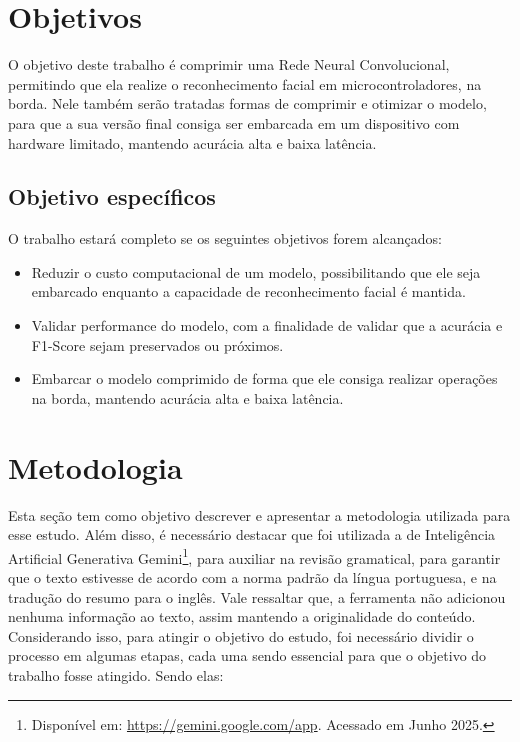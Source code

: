 \section{Objetivos}

O objetivo deste trabalho é comprimir uma Rede Neural Convolucional, permitindo que ela realize o reconhecimento
facial em microcontroladores, na borda.
Nele também serão tratadas formas de comprimir e otimizar o modelo, para que a sua versão final consiga ser embarcada
em um dispositivo com hardware limitado, mantendo acurácia alta e baixa latência.

\subsection{Objetivo específicos}
O trabalho estará completo se os seguintes objetivos forem alcançados:

\begin{itemize}
	\item Reduzir o custo computacional de um modelo, possibilitando que ele seja embarcado enquanto a capacidade
		de reconhecimento facial é mantida.
	\item Validar performance do modelo, com a finalidade de validar que a acurácia e F1-Score sejam preservados
		ou próximos.
	\item Embarcar o modelo comprimido de forma que ele consiga realizar operações na borda, mantendo acurácia
		alta e baixa latência.
\end{itemize}

\section{Metodologia}
Esta seção tem como objetivo descrever e apresentar a metodologia utilizada para esse estudo.
Além disso, é necessário destacar que foi utilizada a de Inteligência Artificial Generativa
Gemini\footnote{Disponível em: \url{https://gemini.google.com/app}. Acessado em Junho 2025.}, para auxiliar na revisão
gramatical, para garantir que o texto estivesse de acordo com a norma padrão da língua portuguesa, e na tradução do resumo
para o inglês. Vale ressaltar que, a ferramenta não adicionou nenhuma informação ao texto, assim mantendo a originalidade
do conteúdo.
Considerando isso, para atingir o objetivo do estudo, foi necessário dividir o processo em algumas etapas, cada uma sendo
essencial para que o objetivo do trabalho fosse atingido. Sendo elas:

